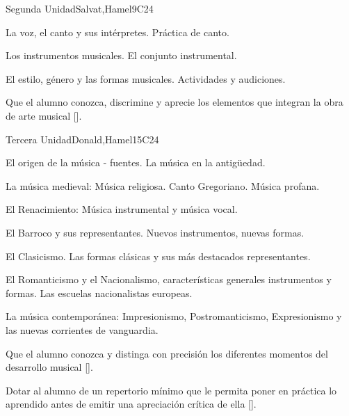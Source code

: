 \begin{syllabus}
\begin{unit}{}{Segunda Unidad}{Salvat,Hamel}{9}{C24}
\begin{topics}
	\item La voz, el canto y sus intérpretes. Práctica de canto.
	\item Los instrumentos musicales. El conjunto instrumental.
	\item El estilo, género y las formas musicales. Actividades y audiciones.
\end{topics}
\begin{learningoutcomes}
	\item Que el alumno conozca, discrimine y aprecie los elementos que integran la obra de arte musical [\Usage].
\end{learningoutcomes}
\end{unit}

\begin{unit}{}{Tercera Unidad}{Donald,Hamel}{15}{C24}
\begin{topics}
	\item El origen de la música - fuentes. La música en la antigüedad.
	\item La música medieval: Música religiosa.  Canto Gregoriano. Música profana.
	\item El Renacimiento: Música instrumental y música vocal.
	\item El Barroco y sus representantes. Nuevos instrumentos, nuevas formas.
	\item El Clasicismo. Las formas clásicas y sus más destacados representantes.
	\item El Romanticismo y el Nacionalismo, características generales instrumentos y formas. Las escuelas nacionalistas europeas.
	\item La música contemporánea: Impresionismo, Postromanticismo, Expresionismo y las nuevas corrientes de vanguardia.
\end{topics}
\begin{learningoutcomes}
	\item Que el alumno conozca y distinga con precisión los diferentes momentos del desarrollo musical [\Usage].
	\item Dotar al alumno de un repertorio mínimo que le permita poner en práctica lo aprendido antes de emitir una apreciación crítica de ella [\Usage].
\end{learningoutcomes}
\end{unit}


\end{syllabus}
